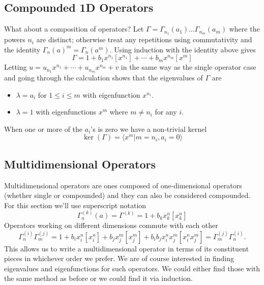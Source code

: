 \subsection{Compounded 1D Operators}

What about a composition of operators? Let $\Gamma = \Gamma_{n_1}(a_1)\ldots\Gamma_{n_m}(a_m)$ where the powers $n_i$ are distinct; otherwise treat any repetitions using commutativity and the identity $\Gamma_n(a)^m = \Gamma_n(a^m)$. Using induction with the identity above gives
\[
	\Gamma = 1 + b_1x^{n_1}[x^{n_1}]+\cdots + b_mx^{n_m}[x^m]
\]
Letting $u = u_{n_1}x^{n_1}+\cdots+ u_{n_m}x^{n_m} + v$ in the same way as the single operator case and going through the calculation shows that the eigenvalues of $\Gamma$ are
\begin{itemize}
\item $\lambda = a_i$ for $1\leq i \leq m$ with eigenfunction $x^{n_i}$.
\item $\lambda = 1$ with eigenfunctions $x^m$ where $m \neq n_i$ for any $i$.
\end{itemize}

When one or more of the $a_i$'s is zero we have a non-trivial kernel
\[
	\ker(\Gamma) = \langle x^m | m = n_i, a_i = 0\rangle
\]

\subsection{Multidimensional Operators}
Multidimensional operators are ones composed of one-dimensional operators (whether single or compounded) and they can also be considered compounded. For this section we'll use superscript notation
\[
	\Gamma_n^{(k)}(a) = \Gamma^{(k)} = 1 + b_{k}x_k^n[x_k^n]
\]
Operators working on different dimensions commute with each other
\[
	\Gamma_n^{(i)}\Gamma_m^{(j)} = 1  +b_ix_i^n[x_i^n]+b_jx_j^m[x_j^m] + b_ib_jx_i^nx_j^m[x_i^n x_j^m]= \Gamma_m^{(j)}\Gamma_n^{(i)}.
\]
This allows us to write a multidimensional operator in terms of its constituent pieces in whichever order we prefer. We are of course interested in finding eigenvalues and eigenfunctions for such operators. We could either find those with the same method as before or we could find it via induction.

